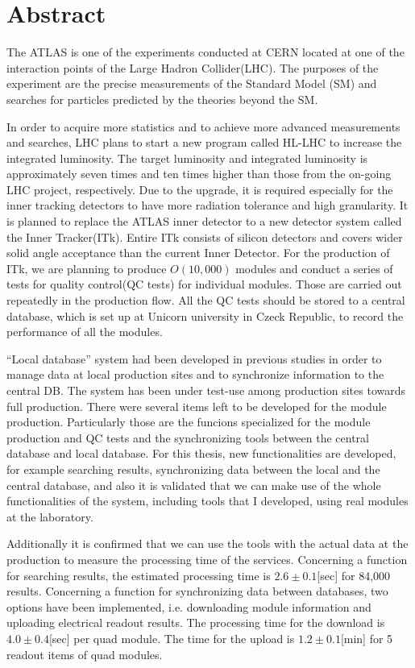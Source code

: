 \chapter*{Abstract}

The ATLAS is one of the experiments conducted at CERN located at one of the interaction points of the Large Hadron Collider(LHC).
The purposes of the experiment are the precise measurements of the Standard Model (SM) and searches for particles predicted by the theories beyond the SM.

In order to acquire more statistics and to achieve more advanced measurements and searches, 
LHC plans to start a new program called HL-LHC to increase the integrated luminosity.
The target luminosity and integrated luminosity is approximately seven times and ten times higher than those from the on-going LHC project, respectively.
Due to the upgrade, it is required especially for the inner tracking detectors to have more radiation tolerance and high granularity. 
It is planned to replace the ATLAS inner detector to a new detector system called the Inner Tracker(ITk). 
Entire ITk consists of silicon detectors and covers wider solid angle acceptance than the current Inner Detector.
For the production of ITk, we are planning to produce $O(10,000)$ modules and conduct a series of tests for quality control(QC tests) for individual modules. 
Those are carried out repeatedly in the production flow.
All the QC tests should be stored to a central database, which is set up at Unicorn university in Czeck Republic, to record the performance of all the modules. 

``Local database'' system had been developed in previous studies in order to manage data at local production sites and to synchronize information to the central DB. The system has been under test-use among production sites towards full production.
There were several items left to be developed for the module production. 
Particularly those are the funcions specialized for the module production and QC tests and the synchronizing tools between the central database and local database.
For this thesis, new functionalities are developed, for example searching results, synchronizing data between the local and the central database, and also it is validated that we can make use of the whole functionalities of the system, including tools that I developed, using real modules at the laboratory. 

Additionally it is confirmed that we can use the tools with the actual data at the production to measure the processing time of the services.
Concerning a function for searching results, the estimated processing time is $2.6\pm 0.1$[sec] for 84,000 results.
Concerning a function for synchronizing data between databases, 
two options have been implemented, i.e. downloading module information and uploading electrical readout results.
The processing time for the download is $4.0\pm 0.4$[sec] per quad module.
The time for the upload is $1.2\pm 0.1$[min] for 5 readout items of quad modules.


